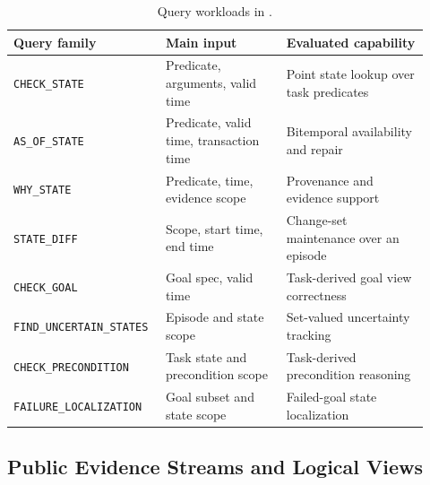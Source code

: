 \begin{table}[!t]
\caption{Query workloads in \bench.}
\label{tab:query-workloads}
\centering
\scriptsize
\setlength{\tabcolsep}{2.4pt}
\renewcommand{\arraystretch}{1.13}
\begingroup
{}
\begin{tabular}{@{}p{0.31\linewidth}p{0.28\linewidth}p{0.33\linewidth}@{}}
\toprule
\rowcolor{gray!15}
\textbf{Query family} & \textbf{Main input} & \textbf{Evaluated capability} \\
\midrule
\texttt{CHECK\_STATE} & Predicate, arguments, valid time & Point state lookup over task predicates \\
\texttt{AS\_OF\_STATE} & Predicate, valid time, transaction time & Bitemporal availability and repair \\
\texttt{WHY\_STATE} & Predicate, time, evidence scope & Provenance and evidence support \\
\texttt{STATE\_DIFF} & Scope, start time, end time & Change-set maintenance over an episode \\
\texttt{CHECK\_GOAL} & Goal spec, valid time & Task-derived goal view correctness \\
\texttt{FIND\_UNCERTAIN\_STATES} & Episode and state scope & Set-valued uncertainty tracking \\
\texttt{CHECK\_PRECONDITION} & Task state and precondition scope & Task-derived precondition reasoning \\
\texttt{FAILURE\_LOCALIZATION} & Goal subset and state scope & Failed-goal state localization \\
\bottomrule
\end{tabular}
\endgroup
\end{table}

\subsection{Public Evidence Streams and Logical Views}

